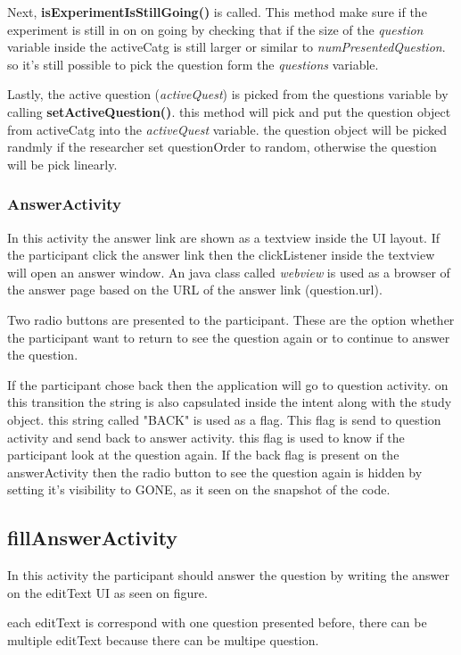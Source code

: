 Next, \textbf{isExperimentIsStillGoing()} is called. This method make sure if the experiment is still in on on going by checking that if the size of the \textit{question} variable inside the activeCatg is still larger or similar to \textit{numPresentedQuestion}. so it's still possible to pick the question form the \textit{questions} variable.

Lastly, the active question (\textit{activeQuest}) is picked from the questions variable by calling \textbf{setActiveQuestion()}. this method will pick and put the question object from activeCatg into the  \textit{activeQuest} variable. the question object will be picked randmly if the researcher set questionOrder to random, otherwise the question will be pick linearly.


\subsubsection{AnswerActivity}
In this activity the answer link are shown as a textview inside the UI layout. If the participant click the answer link then the clickListener inside the textview will open an answer window. An java class called \textit{webview} is used as a browser of the answer page based on the URL of the answer link (question.url).

Two radio buttons are presented to the participant. These are the option whether the participant want to return to see the question again or to continue to answer the question.

If the participant chose back then the application will go to question activity. on this transition the string is also capsulated inside the intent along with the study object. this string called "BACK" is used as a flag. This flag is send to question activity and send back to answer activity. this flag is used to know if the participant look at the question again.
If the back flag is present on the answerActivity then the radio button to see the question again is hidden by setting it's visibility to GONE, as it seen on the snapshot of the code.

\subsection{fillAnswerActivity}
In this activity the participant should answer the question by writing the answer on the editText UI as seen on figure.

each editText is correspond with one question presented before, there can be multiple editText because there can be multipe question.

